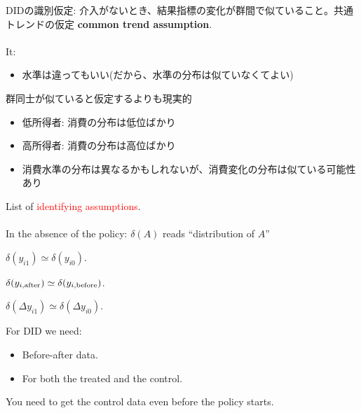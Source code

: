 \begin{frame}{}
DIDの識別仮定: 介入がないとき、結果指標の変化が群間で似ていること。\pause 共通トレンドの仮定 \textbf{common trend assumption}.\\~\\

\pause It:
\begin{itemize}[<+->]
\vspace{1.0ex}\setlength{\itemsep}{1.0ex}\setlength{\baselineskip}{12pt}
\item	水準は違ってもいい(だから、水準の分布は似ていなくてよい)
\end{itemize}
\pause
群同士が似ていると仮定するよりも現実的
\begin{itemize}[<+->]
\vspace{1.0ex}\setlength{\itemsep}{1.0ex}\setlength{\baselineskip}{12pt}
\item	低所得者: 消費の分布は低位ばかり
\item	高所得者: 消費の分布は高位ばかり
\item	消費水準の分布は異なるかもしれないが、消費変化の分布は似ている可能性あり
\end{itemize}
\end{frame}

\begin{frame}{}
List of \textcolor{red}{identifying assumptions}. \\~\\
In the absence of the policy: $\delta(A)$ reads ``distribution of $A$''
\begin{description}[<+->]
\vspace{1.0ex}\setlength{\itemsep}{1.0ex}\setlength{\baselineskip}{12pt}
\item[With-without] $\delta(y_{i1}) \simeq \delta(y_{i0})$.
\item[Before-after] $\delta(y_{i, \mbox{\scriptsize after}}) \simeq \delta(y_{i, \mbox{\scriptsize before}})$.
\item[DID] $\delta(\Delta y_{i1}) \simeq \delta(\Delta y_{i0})$.
\end{description}
\pause 
For DID we need:
\begin{itemize}[<+->]
\vspace{1.0ex}\setlength{\itemsep}{1.0ex}\setlength{\baselineskip}{12pt}
\item	Before-after data.
\item	For both the treated and the control.
\end{itemize}
\pause 
You need to get the control data even before the policy starts. 
\end{frame}


